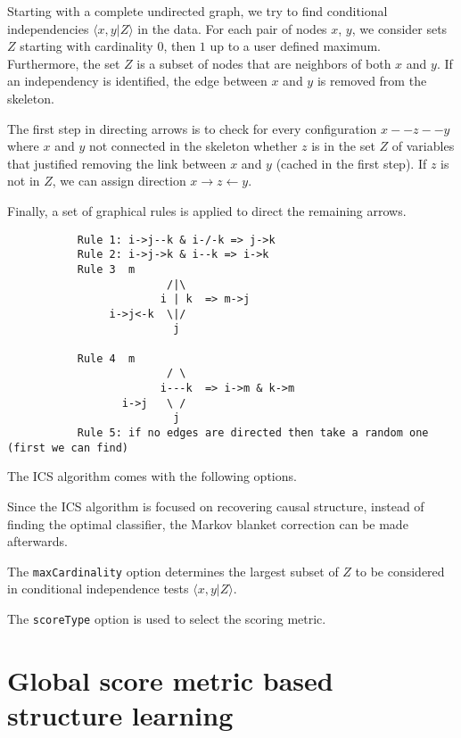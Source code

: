 \documentclass{article}
\begin{document}
Starting with a complete undirected graph, we try to find conditional independencies
$\langle x,y|Z\rangle$ in the data. For each pair of nodes $x$, $y$, we consider sets
$Z$ starting with cardinality $0$, then $1$ up to a user defined maximum. Furthermore,
the set $Z$ is a subset of nodes that are neighbors of both $x$ and $y$. If an
independency is identified, the edge between $x$ and $y$ is removed from the skeleton.

The first step in directing arrows is to check for every configuration $x--z--y$
where $x$ and $y$ not connected in the skeleton whether $z$ is in the set $Z$ of
variables that justified removing the link between $x$ and $y$ (cached in the
first step). If $z$ is not in $Z$, we can assign direction $x\to z\leftarrow y$.

Finally, a set of graphical rules is applied \cite{verma} to direct the remaining
arrows.
\begin{verbatim}
           Rule 1: i->j--k & i-/-k => j->k
           Rule 2: i->j->k & i--k => i->k
           Rule 3  m
                         /|\
                        i | k  => m->j
                i->j<-k  \|/
                          j
        
           Rule 4  m
                         / \
                        i---k  => i->m & k->m
                  i->j   \ /
                          j
           Rule 5: if no edges are directed then take a random one (first we can find)
\end{verbatim}

The ICS algorithm comes with the following options.

\begin{center}
\end{center}

Since the ICS algorithm is focused on recovering causal structure, instead of 
finding the optimal classifier, the Markov blanket correction can be made 
afterwards.

The {\tt maxCardinality} option determines the largest subset of $Z$ to be 
considered in conditional independence tests $\langle x,y|Z\rangle$.

The {\tt scoreType} option is used to select the scoring metric.

\section{Global score metric based structure learning}
\end{document}
